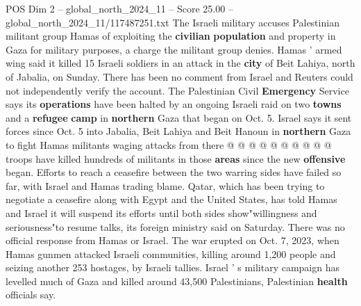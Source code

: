 \begin{textsample}{POS Dim 2 – global\_north\_2024\_11 – Score 25.00 – global\_north\_2024\_11/117487251.txt}
The Israeli military accuses Palestinian militant group Hamas of exploiting the \textbf{civilian} \textbf{population} and property in Gaza for military purposes, a charge the militant group denies.
Hamas ' armed wing said it killed 15 Israeli soldiers in an attack in the \textbf{city} of Beit Lahiya, north of Jabalia, on Sunday.
There has been no comment from Israel and Reuters could not independently verify the account.
The Palestinian Civil \textbf{Emergency} Service says its \textbf{operations} have been halted by an ongoing Israeli raid on two \textbf{towns} and a \textbf{refugee} \textbf{camp} in \textbf{northern} Gaza that began on Oct. 5.
Israel says it sent forces since Oct. 5 into Jabalia, Beit Lahiya and Beit Hanoun in \textbf{northern} Gaza to fight Hamas militants waging attacks from there @ @ @ @ @ @ @ @ @ @ troops have killed hundreds of militants in those \textbf{areas} since the new \textbf{offensive} began.
Efforts to reach a ceasefire between the two warring sides have failed so far, with Israel and Hamas trading blame.
Qatar, which has been trying to negotiate a ceasefire along with Egypt and the United States, has told Hamas and Israel it will suspend its efforts until both sides show"willingness and seriousness"to resume talks, its foreign ministry said on Saturday.
There was no official response from Hamas or Israel.
The war erupted on Oct. 7, 2023, when Hamas gunmen attacked Israeli communities, killing around 1,200 people and seizing another 253 hostages, by Israeli tallies.
Israel ' s military campaign has levelled much of Gaza and killed around 43,500 Palestinians, Palestinian \textbf{health} officials say.

\end{textsample}
